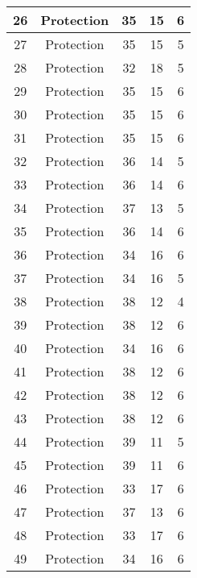 \documentclass[results.tex]{subfiles}
\begin{document}
\begin{center}
\begin{tabular}{| c || c | c | c | c |}
    \hline
    26 & Protection & 35 & 15 & 6 \\ 
    \hline
    27 & Protection & 35 & 15 & 5 \\ 
    \hline
    28 & Protection & 32 & 18 & 5 \\ 
    \hline
    29 & Protection & 35 & 15 & 6 \\ 
    \hline
    30 & Protection & 35 & 15 & 6 \\ 
    \hline
    31 & Protection & 35 & 15 & 6 \\ 
    \hline
    32 & Protection & 36 & 14 & 5 \\ 
    \hline
    33 & Protection & 36 & 14 & 6 \\ 
    \hline
    34 & Protection & 37 & 13 & 5 \\ 
    \hline
    35 & Protection & 36 & 14 & 6 \\ 
    \hline
    36 & Protection & 34 & 16 & 6 \\ 
    \hline
    37 & Protection & 34 & 16 & 5 \\ 
    \hline
    38 & Protection & 38 & 12 & 4 \\ 
    \hline
    39 & Protection & 38 & 12 & 6 \\ 
    \hline
    40 & Protection & 34 & 16 & 6 \\ 
    \hline
    41 & Protection & 38 & 12 & 6 \\ 
    \hline
    42 & Protection & 38 & 12 & 6 \\ 
    \hline
    43 & Protection & 38 & 12 & 6 \\ 
    \hline
    44 & Protection & 39 & 11 & 5 \\ 
    \hline
    45 & Protection & 39 & 11 & 6 \\ 
    \hline
    46 & Protection & 33 & 17 & 6 \\ 
    \hline
    47 & Protection & 37 & 13 & 6 \\ 
    \hline
    48 & Protection & 33 & 17 & 6 \\ 
    \hline
    49 & Protection & 34 & 16 & 6 \\ 
    \hline   \end{tabular}
\end{center}
\end{document}
